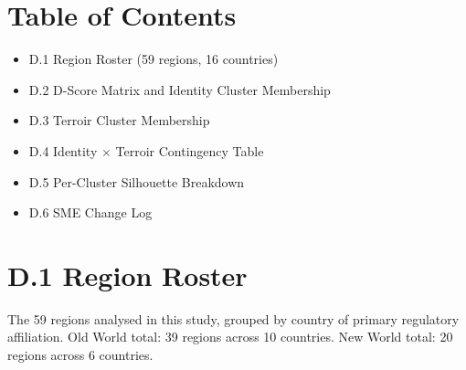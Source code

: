 \documentclass[11pt]{article}
\begin{document}

\section*{Table of Contents}
\begin{itemize}[leftmargin=2em,itemsep=0.1em,topsep=0.1em]
\item D.1 Region Roster (59 regions, 16 countries)
\item D.2 D-Score Matrix and Identity Cluster Membership
\item D.3 Terroir Cluster Membership
\item D.4 Identity $\times$ Terroir Contingency Table
\item D.5 Per-Cluster Silhouette Breakdown
\item D.6 SME Change Log
\end{itemize}

\section*{D.1 Region Roster}
The 59 regions analysed in this study, grouped by country of primary regulatory affiliation. Old World total: 39 regions across 10 countries. New World total: 20 regions across 6 countries.
\end{document}
